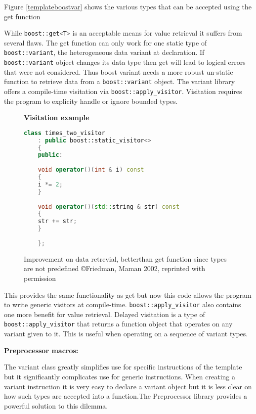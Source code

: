 \documentclass[letterpaper, 12pt]{article}
\newcommand{\inlinecode}[1]{\colorbox{codegrey}{\lstinline[language=C++]{#1}}}
\begin{document}
Figure \ref{templateboostvar} shows the various types that can be accepted using the get function

While \inlinecode{boost::get<T>} is an acceptable means for value retrieval it suffers from several flaws.
The get function can only work for one static type of \inlinecode{boost::variant},
the heterogeneous data variant at declaration. If \inlinecode{boost::variant} object
changes its data type then get will lead to logical errors that were not considered.
Thus boost variant needs a more robust un-static function to retrieve
data from a \inlinecode{boost::variant} object. The variant library offers a compile-time visitation
via \inlinecode{boost::apply_visitor}. Visitation requires the program to explicity handle or ignore bounded types.
\par\vspace{\baselineskip}


\begin{figure}
  \centering
  \textbf{Visitation example}
  \begin{lstlisting}[language=C++]
  	class times_two_visitor
  	: public boost::static_visitor<>
  	{
  	public:
  	
  	void operator()(int & i) const
  	{
  	i *= 2;
  	}
  	
  	void operator()(std::string & str) const
  	{
  	str += str;
  	}
  	
  	};
  \end{lstlisting}
  \cite{boostvariant}
  \caption{Improvement on data retrevial, betterthan get function since types are not predefined \copyright Friedman, Maman 2002, reprinted with permission} \label{visitationexample}
\end{figure}

This provides the same functionality as get but now this code allows the program to write
generic visitors at compile-time. \inlinecode{boost::apply_visitor} also contains one more benefit for
value retrieval. Delayed visitation is a type of \inlinecode{boost::apply_visitor} that returns
a function object that operates on any variant given to it. This is useful when operating on a sequence of
variant types.
\par\vspace{\baselineskip}

{\bfseries Preprocessor macros:}

\par\vspace{\baselineskip}
The variant class greatly simplifies use for specific instructions of the template but it
significantly complicates use for generic instructions. When creating a variant instruction
it is very easy to declare a variant object but it is less clear on how such types are
accepted into a function.The Preprocessor library provides a powerful solution to this dilemma.
\end{document}
